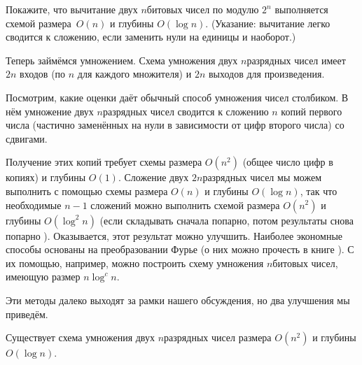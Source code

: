 \begin{problem}
Покажите, что вычитание двух $n$\д битовых чисел по модулю $2^n$
выполняется схемой размера~$O(n)$ и глубины $O(\log n)$.
(Указание: вычитание легко сводится к сложению, если заменить
нули на единицы и наоборот.)
\end{problem}

Теперь займёмся умножением. Схема умножения двух $n$\д разрядных
чисел имеет $2n$ входов (по $n$ для каждого множителя) и $2n$
выходов для произведения.

Посмотрим, какие оценки даёт обычный способ умножения чисел
столбиком. В нём умножение двух $n$\д разрядных чисел сводится к
сложению $n$ копий первого числа (частично заменённых на нули в
зависимости от цифр второго числа) со сдвигами.

Получение этих копий требует схемы размера $O(n^2)$ (общее число
цифр в копиях) и глубины $O(1)$. Сложение двух $2n$\д разрядных
чисел мы можем выполнить с помощью схемы размера $O(n)$ и
глубины $O(\log n)$, так что необходимые $n-1$ сложений можно
выполнить схемой размера $O(n^2)$ и глубины $O(\log^2 n)$ (если
складывать сначала попарно, потом результаты снова попарно
). Оказывается, этот результат можно улучшить. Наиболее
экономные способы основаны на преобразовании Фурье (о них можно
прочесть в книге \cite{aho-hopcroft-ullman}). С их
помощью, например, можно построить схему умножения $n$\д битовых
чисел, имеющую размер $n\log^c n$.

Эти методы далеко выходят за рамки нашего обсуждения, но два
улучшения мы приведём.

\begin{theorem}
        \label{fast-multiplication}
Существует схема умножения двух $n$\д разрядных
чисел размера $O(n^2)$ и глубины $O(\log n)$.
\end{theorem}

